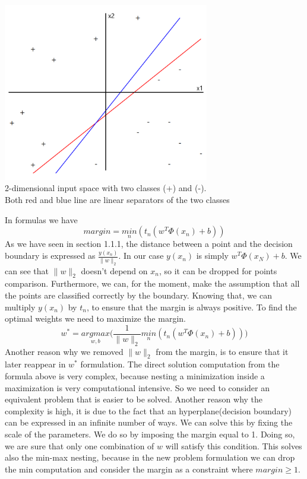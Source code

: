 \documentclass[../main.tex]{subfiles}
\begin{document}
\begin{center}
    \includegraphics[width=90mm]{images/SVM_Margin.PNG} \\
    2-dimensional input space with two classes (+) and (-). \\
    Both red and blue line are linear separators of the two classes
\end{center}
In formulas we have
\begin{equation}
    margin = \underset{n}{min} (t_n (w^T \Phi(x_n) + b))
\end{equation}
As we have seen in section 1.1.1, the distance between a point and the decision boundary is expressed as $\frac{y(x_n)}{\|w\|_2}$. In our case $y(x_n)$ is simply $w^T\Phi(x_N) + b$. We can see that $\|w\|_2$ doesn't depend on $x_n$, so it can be dropped for points comparison. Furthermore, we can, for the moment, make the assumption that all the points are classified correctly by the boundary. Knowing that, we can multiply $y(x_n)$ by $t_n$, to ensure that the margin is always positive.
\newline
To find the optimal weights we need to maximize the margin.
\begin{equation*}
    w^* = \underset{w,b}{argmax} \bigg( \frac{1}{\|w\|_2} \underset{n}{min} (t_n (w^T \Phi(x_n) + b)) \bigg)
\end{equation*}
Another reason why we removed $\|w\|_2$ from the margin, is to ensure that it later reappear in $w^*$ formulation.
The direct solution computation from the formula above is very complex, because nesting a minimization inside a maximization is very computational intensive. So we need to consider an equivalent problem that is easier to be solved. Another reason why the complexity is high, it is due to the fact that an hyperplane(decision boundary) can be expressed in an infinite number of ways\footnotemark. We can solve this by fixing the scale of the parameters. We do so by imposing the margin equal to 1. Doing so, we are sure that only one combination of $w$ will satisfy this condition. This solves also the min-max nesting, because in the new problem formulation we can drop the min computation and consider the margin as a constraint where $margin \geq 1$.
\end{document}
